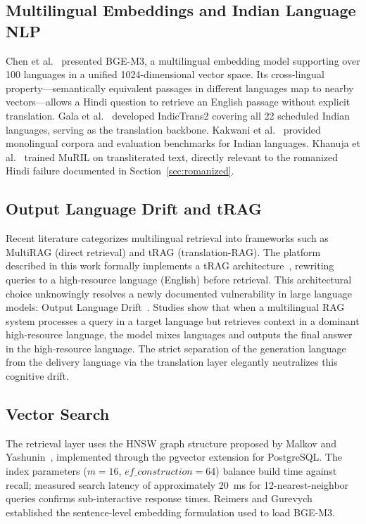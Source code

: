 \documentclass[conference]{IEEEtran}
\begin{document}
\subsection{Multilingual Embeddings and Indian Language NLP}
Chen et al.~\cite{b6} presented BGE-M3, a multilingual embedding model supporting over 100 languages in a unified 1024-dimensional vector space. Its cross-lingual property---semantically equivalent passages in different languages map to nearby vectors---allows a Hindi question to retrieve an English passage without explicit translation. Gala et al.~\cite{b7} developed IndicTrans2 covering all 22 scheduled Indian languages, serving as the translation backbone. Kakwani et al.~\cite{b1} provided monolingual corpora and evaluation benchmarks for Indian languages. Khanuja et al.~\cite{b8} trained MuRIL on transliterated text, directly relevant to the romanized Hindi failure documented in Section~\ref{sec:romanized}.

\subsection{Output Language Drift and tRAG}
Recent literature categorizes multilingual retrieval into frameworks such as MultiRAG (direct retrieval) and tRAG (translation-RAG). The platform described in this work formally implements a tRAG architecture~\cite{b9}, rewriting queries to a high-resource language (English) before retrieval. This architectural choice unknowingly resolves a newly documented vulnerability in large language models: Output Language Drift~\cite{b10}. Studies show that when a multilingual RAG system processes a query in a target language but retrieves context in a dominant high-resource language, the model mixes languages and outputs the final answer in the high-resource language. The strict separation of the generation language from the delivery language via the translation layer elegantly neutralizes this cognitive drift.

\subsection{Vector Search}
The retrieval layer uses the HNSW graph structure proposed by Malkov and Yashunin~\cite{b11}, implemented through the pgvector extension for PostgreSQL. The index parameters ($m=16$, $ef\_construction=64$) balance build time against recall; measured search latency of approximately 20~ms for 12-nearest-neighbor queries confirms sub-interactive response times. Reimers and Gurevych~\cite{b12} established the sentence-level embedding formulation used to load BGE-M3.
\end{document}
